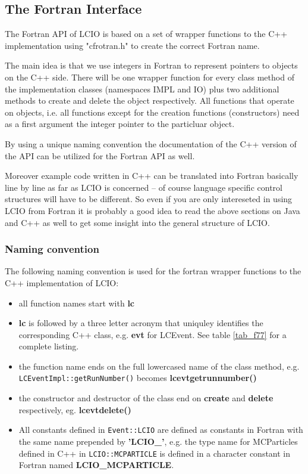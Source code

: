 \subsection{The Fortran Interface} \label{f77api}

The Fortran API of LCIO is based on a set of wrapper functions to the 
C++ implementation using "cfrotran.h" to create the correct Fortran name.

The main idea is that we use integers in Fortran to represent pointers to 
objects on the C++ side. There will be one wrapper function for every class method
of the implementation classes (namespaces IMPL and IO) plus two additional methods 
to create and delete the object respectively. All functions that operate on objects, i.e.
all functions except for the creation functions (constructors) need as a first argument 
the integer pointer to the particluar object.

By using a unique naming convention the documentation of the C++ version of the API
can be utilized for the Fortran API as well.

Moreover example code written in C++ can be translated into Fortran basically line by 
line as far as LCIO is concerned -- of course language specific control structures 
will have to be different. So even if you are only intereseted in using LCIO from Fortran 
it is probably a good idea to read the above sections on Java and C++ as well to get some 
insight into the general structure of LCIO.

\subsubsection{Naming convention}
The following naming convention is used for the fortran wrapper functions to the 
C++ implementation of LCIO:
\begin{itemize}

\item{all function names start with {\bf lc}}

\item{{\bf lc} is followed by a three letter acronym that uniquley identifies the 
corresponding C++ class, e.g. {\bf evt} for LCEvent.} See table \ref{tab_f77} for a complete 
listing.

\item{the function name ends on the full lowercased name of the class method, e.g. \\
 \verb$LCEventImpl::getRunNumber()$ becomes  {\bf lcevtgetrunnumber() } }

\item{the constructor and destructor of the class  end on {\bf create} and {\bf delete} 
respectively, eg. {\bf lcevtdelete()} }

\item{All constants defined in \verb$Event::LCIO$ are defined as constants in Fortran with the 
same name prepended by {\bf 'LCIO\_'}, e.g. the type name for MCParticles defined in C++ in
\verb$LCIO::MCPARTICLE$ is defined in a character constant in Fortran named
{\bf LCIO\_MCPARTICLE}.}
\end{itemize}


